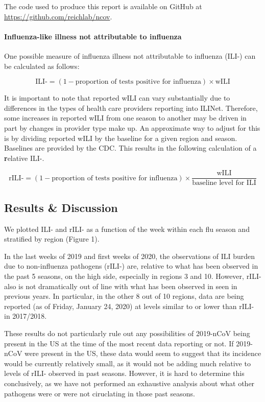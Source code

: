 \documentclass[]{article}
\let\oldparagraph\paragraph
\renewcommand{\paragraph}[1]{\oldparagraph{#1}\mbox{}}
\begin{document}
The code used to produce this report is available on GitHub at
\url{https://github.com/reichlab/ncov}.

\hypertarget{influenza-like-illness-not-attributable-to-influenza}{%
\paragraph{Influenza-like illness not attributable to
influenza}\label{influenza-like-illness-not-attributable-to-influenza}}

One possible measure of influenza illness not attributable to influenza
(ILI-) can be calculated as follows:

\[\text{ILI-} = (1 - \text{proportion of tests positive for influenza}) \times \text{wILI}\]

It is important to note that reported wILI can vary substantially due to
differences in the types of health care providers reporting into ILINet.
Therefore, some increases in reported wILI from one season to another
may be driven in part by changes in provider type make up. An
approximate way to adjust for this is by dividing reported wILI by the
baseline for a given region and season. Baselines are provided by the
CDC. This results in the following calculation of a \textbf{r}elative
ILI-.

\[\text{rILI-} = (1 - \text{proportion of tests positive for influenza}) \times \frac{\text{wILI}}{\text{baseline level for ILI}}\]

\hypertarget{results-discussion}{%
\subsection{Results \& Discussion}\label{results-discussion}}

We plotted ILI- and rILI- as a function of the week within each flu
season and stratified by region (Figure 1).

In the last weeks of 2019 and first weeks of 2020, the observations of
ILI burden due to non-influenza pathogens (rILI-) are, relative to what
has been observed in the past 5 seasons, on the high side, especially in
regions 3 and 10. However, rILI- also is not dramatically out of line
with what has been observed in seen in previous years. In particular, in
the other 8 out of 10 regions, data are being reported (as of Friday,
January 24, 2020) at levels similar to or lower than rILI- in 2017/2018.

These results do not particularly rule out any possibilities of
2019-nCoV being present in the US at the time of the most recent data
reporting or not. If 2019-nCoV were present in the US, these data would
seem to suggest that its incidence would be currently relatively small,
as it would not be adding much relative to levels of rILI- observed in
past seasons. However, it is hard to determine this conclusively, as we
have not performed an exhaustive analysis about what other pathogens
were or were not ciruclating in those past seasons.
\end{document}
